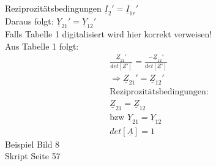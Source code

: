 Reziprozitätsbedingungen $\underline{I}_{2}'=\underline{I}_{1r}'$\\
Daraus folgt: $\underline{Y}_{21}'=\underline{Y}_{12}'$\\
Falls Tabelle 1 digitalisiert wird hier korrekt verweisen!\\
Aus Tabelle 1 folgt:\\
\begin{align}
	\frac{\underline{Z}_{21}'}{det[\underline{Z}']}=\frac{-\underline{Z}_{12}'}{det[\underline{Z}']}\nonumber\\
	\Rightarrow \underline{Z}_{21}'=\underline{Z}_{12}'\nonumber\\
	\text{Reziprozitätsbedingungen:}\nonumber\\
	\boxed{\underline{Z}_{21}=\underline{Z}_{12}}\nonumber\\
	\text{bzw }\boxed{\underline{Y}_{21}=\underline{Y}_{12}}\nonumber\\
	\boxed{det[\underline{A}]=1}\nonumber
\end{align}
Beispiel Bild 8\\
Skript Seite 57\\

